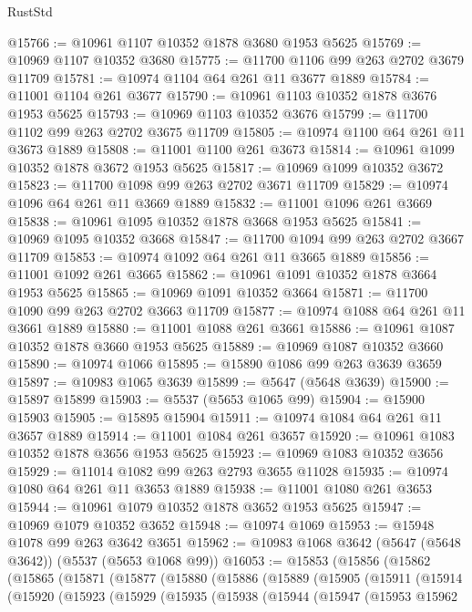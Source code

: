 \begin{lexlean}{RustStd}
\begin{coremodule}
@15766 := @10961 @1107 @10352 @1878 @3680 @1953 @5625
@15769 := @10969 @1107 @10352 @3680
@15775 := @11700 @1106 @99 @263 @2702 @3679 @11709
@15781 := @10974 @1104 @64 @261 @11 @3677 @1889
@15784 := @11001 @1104 @261 @3677
@15790 := @10961 @1103 @10352 @1878 @3676 @1953 @5625
@15793 := @10969 @1103 @10352 @3676
@15799 := @11700 @1102 @99 @263 @2702 @3675 @11709
@15805 := @10974 @1100 @64 @261 @11 @3673 @1889
@15808 := @11001 @1100 @261 @3673
@15814 := @10961 @1099 @10352 @1878 @3672 @1953 @5625
@15817 := @10969 @1099 @10352 @3672
@15823 := @11700 @1098 @99 @263 @2702 @3671 @11709
@15829 := @10974 @1096 @64 @261 @11 @3669 @1889
@15832 := @11001 @1096 @261 @3669
@15838 := @10961 @1095 @10352 @1878 @3668 @1953 @5625
@15841 := @10969 @1095 @10352 @3668
@15847 := @11700 @1094 @99 @263 @2702 @3667 @11709
@15853 := @10974 @1092 @64 @261 @11 @3665 @1889
@15856 := @11001 @1092 @261 @3665
@15862 := @10961 @1091 @10352 @1878 @3664 @1953 @5625
@15865 := @10969 @1091 @10352 @3664
@15871 := @11700 @1090 @99 @263 @2702 @3663 @11709
@15877 := @10974 @1088 @64 @261 @11 @3661 @1889
@15880 := @11001 @1088 @261 @3661
@15886 := @10961 @1087 @10352 @1878 @3660 @1953 @5625
@15889 := @10969 @1087 @10352 @3660
@15890 := @10974 @1066
@15895 := @15890 @1086 @99 @263 @3639 @3659
@15897 := @10983 @1065 @3639
@15899 := @5647 (@5648 @3639)
@15900 := @15897 @15899
@15903 := @5537 (@5653 @1065 @99)
@15904 := @15900 @15903
@15905 := @15895 @15904
@15911 := @10974 @1084 @64 @261 @11 @3657 @1889
@15914 := @11001 @1084 @261 @3657
@15920 := @10961 @1083 @10352 @1878 @3656 @1953 @5625
@15923 := @10969 @1083 @10352 @3656
@15929 := @11014 @1082 @99 @263 @2793 @3655 @11028
@15935 := @10974 @1080 @64 @261 @11 @3653 @1889
@15938 := @11001 @1080 @261 @3653
@15944 := @10961 @1079 @10352 @1878 @3652 @1953 @5625
@15947 := @10969 @1079 @10352 @3652
@15948 := @10974 @1069
@15953 := @15948 @1078 @99 @263 @3642 @3651
@15962 := @10983 @1068 @3642 (@5647 (@5648 @3642)) (@5537 (@5653 @1068 @99))
@16053 := @15853
    (@15856
      (@15862
        (@15865
          (@15871
            (@15877
              (@15880
                (@15886
                  (@15889
                    (@15905
                      (@15911
                        (@15914
                          (@15920
                            (@15923
                              (@15929
                                (@15935
                                  (@15938
                                    (@15944
                                      (@15947
                                        (@15953
                                          @15962

\end{coremodule}
\end{lexlean}
